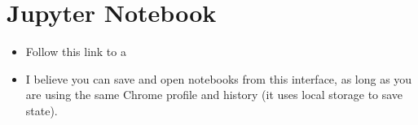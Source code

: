 \documentclass[letterpaper,10pt,english]{jupyterBook}
\begin{document}
\section{Jupyter Notebook}
\label{\detokenize{lessons/hw02:jupyter-notebook}}\begin{itemize}
\item {} 
\sphinxAtStartPar
Follow this link to a 

\item {} 
\sphinxAtStartPar
I believe you can save and open notebooks from this interface, as long as you are using the same Chrome profile and history (it uses local storage to save state).

\end{itemize}
\end{document}
